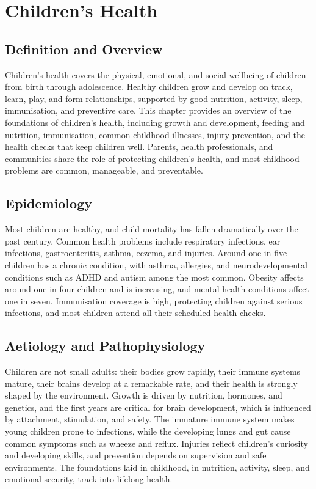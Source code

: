 \chapter{Children's Health}

\section*{Definition and Overview}
Children's health covers the physical, emotional, and social wellbeing of children from birth through adolescence. Healthy children grow and develop on track, learn, play, and form relationships, supported by good nutrition, activity, sleep, immunisation, and preventive care. This chapter provides an overview of the foundations of children's health, including growth and development, feeding and nutrition, immunisation, common childhood illnesses, injury prevention, and the health checks that keep children well. Parents, health professionals, and communities share the role of protecting children's health, and most childhood problems are common, manageable, and preventable.

\section*{Epidemiology}
Most children are healthy, and child mortality has fallen dramatically over the past century. Common health problems include respiratory infections, ear infections, gastroenteritis, asthma, eczema, and injuries. Around one in five children has a chronic condition, with asthma, allergies, and neurodevelopmental conditions such as ADHD and autism among the most common. Obesity affects around one in four children and is increasing, and mental health conditions affect one in seven. Immunisation coverage is high, protecting children against serious infections, and most children attend all their scheduled health checks.

\section*{Aetiology and Pathophysiology}
Children are not small adults: their bodies grow rapidly, their immune systems mature, their brains develop at a remarkable rate, and their health is strongly shaped by the environment. Growth is driven by nutrition, hormones, and genetics, and the first years are critical for brain development, which is influenced by attachment, stimulation, and safety. The immature immune system makes young children prone to infections, while the developing lungs and gut cause common symptoms such as wheeze and reflux. Injuries reflect children's curiosity and developing skills, and prevention depends on supervision and safe environments. The foundations laid in childhood, in nutrition, activity, sleep, and emotional security, track into lifelong health.

